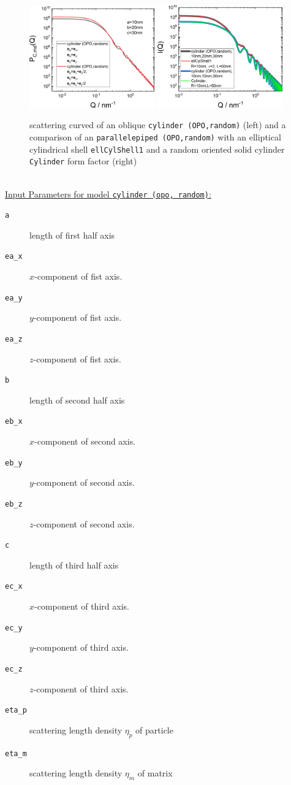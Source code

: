 \begin{figure}[htb]
\includegraphics[width=0.481\textwidth]{../images/form_factor/oriented_primitive_opbjects/cylinderOPOoblique.png} \hfill
\includegraphics[width=0.481\textwidth]{../images/form_factor/oriented_primitive_opbjects/cylinderOPOcompare.png}
\caption{scattering curved of an oblique \texttt{cylinder (OPO,random)} (left) and a comparison of an \texttt{parallelepiped (OPO,random)} with an elliptical cylindrical shell \texttt{ellCylShell1} and a random oriented solid cylinder  \texttt{Cylinder} form factor (right)}
\label{fig:opo_ellipsoidIQrandom}
\end{figure}

~\\
\underline{Input Parameters for model \texttt{cylinder (opo, random)}:}
\begin{description}
\item[\texttt{a}] length of first half axis
\item[\texttt{ea\_x}] $x$-component of fist axis.
\item[\texttt{ea\_y}] $y$-component of fist axis.
\item[\texttt{ea\_z}] $z$-component of fist axis.
\item[\texttt{b}] length of second half axis
\item[\texttt{eb\_x}] $x$-component of second axis.
\item[\texttt{eb\_y}] $y$-component of second axis.
\item[\texttt{eb\_z}] $z$-component of second axis.
\item[\texttt{c}] length of third half axis
\item[\texttt{ec\_x}] $x$-component of third axis.
\item[\texttt{ec\_y}] $y$-component of third axis.
\item[\texttt{ec\_z}] $z$-component of third axis.
\item[\texttt{eta\_p}] scattering length density $\eta_p$ of particle
\item[\texttt{eta\_m}] scattering length density $\eta_m$ of matrix
\end{description}

